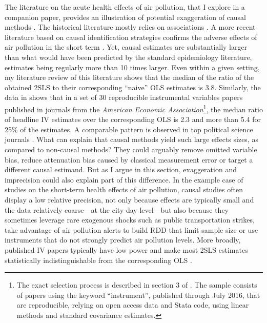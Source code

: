 \documentclass[usletter, 12pt]{article}
\begin{document}
		The literature on the acute health effects of air pollution, that I explore in a companion paper, provides an illustration of potential exaggeration of causal methods \citep{bagilet_accurate_2023}. The historical literature mostly relies on associations \citep{dominici_best_2017, bind_causal_2019}. A more recent literature based on causal identification strategies confirms the adverse effects of air pollution in the short term \citep{schwartz_estimating_2015, schwartz_national_2018, deryugina_mortality_2019}. Yet, causal estimates are substantially larger than what would have been predicted by the standard epidemiology literature, estimates being regularly more than 10 times larger. Even within a given setting, my literature review of this literature shows that the median of the ratio of the obtained 2SLS to their corresponding ``naive'' OLS estimates is 3.8. Similarly, the data in \cite{youngConsistencyInferenceInstrumental2022} shows that in a set of 30 reproducible instrumental variables papers published in journals from the \textit{American Economic Association}\footnote{The exact selection process is described in section 3 of \cite{youngConsistencyInferenceInstrumental2022}. The sample consists of papers using the keyword ``instrument'', published through July 2016, that are reproducible, relying on open access data and Stata code, using linear methods and standard covariance estimates.}, the median ratio of headline IV estimates over the corresponding OLS is 2.3 and more than 5.4 for 25\% of the estimates. A comparable pattern is observed in top political science journals \citep{lalHow2024}.
		What can explain that causal methods yield such large effects sizes, as compared to non-causal methods? They could arguably remove omitted variable bias, reduce attenuation bias caused by classical measurement error or target a different causal estimand. But as I argue in this section, exaggeration and imprecision could also explain part of this difference. In the example case of studies on the short-term health effects of air pollution, causal studies often display a low relative precision, not only because effects are typically small and the data relatively coarse---at the city-day level---but also because they sometimes leverage rare exogenous shocks such as public transportation strikes, take advantage of air pollution alerts to build RDD that limit sample size or use instruments that do not strongly predict air pollution levels. 
		More broadly, published IV papers typically have low power and make most 2SLS estimates statistically indistinguishable from the corresponding OLS \citep{youngConsistencyInferenceInstrumental2022}. 
				 
\end{document}
